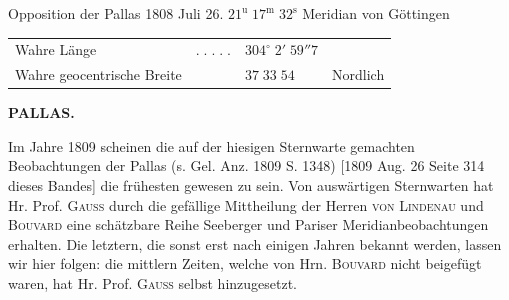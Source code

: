 \begin{center}
Opposition der Pallas 1808 Juli 26. $21^{\text{u}}\;17^{\text{m}}\;32^{\text{s}}$ Meridian von Göttingen\par
\begin{tabular}{@{}lcll@{}}
Wahre Länge & $.\;.\;.\;.\;.$ & $304^\circ\;2'\;59''7$ & \\
Wahre geocentrische Breite & & $37\;33\;54$ & Nordlich
\end{tabular}
\end{center}

\clearpage
\thispagestyle{empty}
\noindent{}%
%
\parbox[t]{\dimexpr\linewidth-24mm\relax}{\centering\footnotesize\bfseries PALLAS.\par}%
\makebox[12mm][r]{}\par\nobreak\medskip
\par\indent Im Jahre 1809 scheinen die auf der hiesigen Sternwarte gemachten Beobachtungen der Pallas (s. Gel. Anz. 1809 S. 1348) [1809 Aug. 26 Seite 314 dieses Bandes] die frühesten gewesen zu sein. Von auswärtigen Sternwarten hat Hr. Prof. \textsc{Gauss} durch die gefällige Mittheilung der Herren \textsc{von Lindenau} und \textsc{Bouvard} eine schätzbare Reihe Seeberger und Pariser Meridianbeobachtungen erhalten. Die letztern, die sonst erst nach einigen Jahren bekannt werden, lassen wir hier folgen: die mittlern Zeiten, welche von Hrn. \textsc{Bouvard} nicht beigefügt waren, hat Hr. Prof. \textsc{Gauss} selbst hinzugesetzt.


